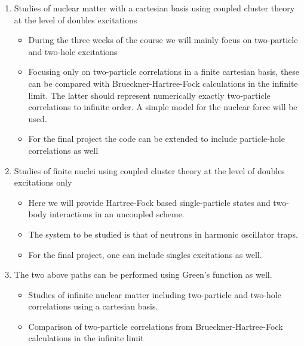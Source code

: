 \documentclass[%
twoside,                 %
final,                   %
10pt]{article}
\begin{document}
\begin{enumerate}
\item Studies of nuclear matter with a cartesian basis using coupled cluster theory at the level of doubles excitations
\begin{itemize}

  \item During the three weeks of the course we will mainly focus on two-particle and two-hole excitations 

  \item Focusing only on two-particle correlations in a finite cartesian basis, these can be compared with Brueckner-Hartree-Fock calculations in the infinite limit. The latter should represent numerically exactly two-particle correlations to infinite order. A simple model for the nuclear force will be used.

  \item For the final project the code can be extended to include particle-hole correlations as well

\end{itemize}

\noindent
\item Studies of finite nuclei using coupled cluster theory at the level of doubles excitations only
\begin{itemize}

  \item Here we will provide Hartree-Fock based single-particle states and two-body interactions in an uncoupled scheme.

  \item The system to be studied is that of neutrons in harmonic oscillator traps. 

  \item For the final project, one can include singles excitations as well.

\end{itemize}

\noindent
\item The two above paths can be performed using Green's function as well.
\begin{itemize}

  \item Studies of infinite nuclear matter including two-particle and two-hole correlations using a cartesian basis.

  \item Comparison of two-particle correlations from Brueckner-Hartree-Fock calculations in the infinite limit


\end{itemize}
\end{enumerate}
\end{document}

